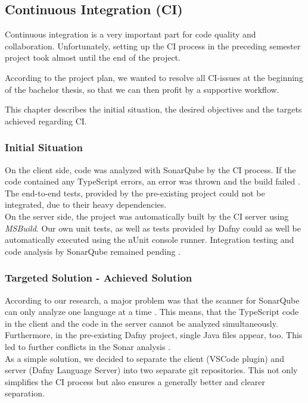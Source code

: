 \subsection{Continuous Integration (CI)}
Continuous integration is a very important part for code quality and collaboration.
Unfortunately, setting up the CI process in the preceding semester project\cite{sa} took almost until the end of the project.

According to the project plan, we wanted to resolve all CI-issues at the beginning of the bachelor thesis, so that we can then profit by a supportive workflow.

This chapter describes the initial situation, the desired objectives and the targets achieved regarding CI.

\subsubsection{Initial Situation}
On the client side, code was analyzed with SonarQube by the CI process.
If the code contained any TypeScript errors, an error was thrown and the build failed \cite{sa}.
The end-to-end tests, provided by the pre-existing project could not be integrated, due to their heavy dependencies.\\

On the server side, the project was automatically built by the CI server using \textit{MSBuild}.
Our own unit tests, as well as tests provided by Dafny could as well be automatically executed using the nUnit console runner.
Integration testing and code analysis by SonarQube remained pending \cite{sa}.

\subsubsection{Targeted Solution - Achieved Solution}
According to our research, a major problem was that the scanner for SonarQube can only analyze one language at a time \cite{sonar-supports-only-one-language}.
This means, that the TypeScript code in the client and the \CsharpWithSpace code in the server cannot be analyzed simultaneously.
Furthermore, in the pre-existing Dafny project, single Java files appear, too.
This led to further conflicts in the Sonar analysis \cite{sa}.\\

As a simple solution, we decided to separate the client (VSCode plugin) and server (Dafny Language Server) into two separate git repositories.
This not only simplifies the CI process but also ensures a generally better and clearer separation. \\

